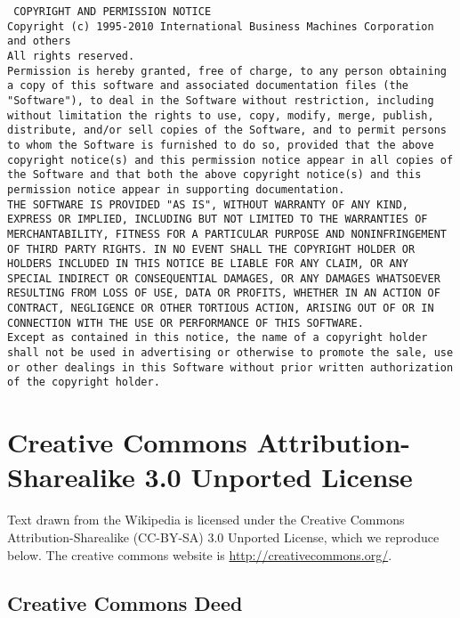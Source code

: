 \setlength{\baselineskip}{0.5\oldbaselineskip}
{\tiny\tt
\noindent
COPYRIGHT AND PERMISSION NOTICE
\\[4pt]
Copyright (c) 1995-2010 International Business Machines Corporation
and others
\\[4pt]
All rights reserved.
\\[4pt]
Permission is hereby granted, free of charge, to any person obtaining
a copy of this software and associated documentation files (the
"Software"), to deal in the Software without restriction, including
without limitation the rights to use, copy, modify, merge, publish,
distribute, and/or sell copies of the Software, and to permit persons
to whom the Software is furnished to do so, provided that the above
copyright notice(s) and this permission notice appear in all copies of
the Software and that both the above copyright notice(s) and this
permission notice appear in supporting documentation.
\\[4pt]
THE SOFTWARE IS PROVIDED "AS IS", WITHOUT WARRANTY OF ANY KIND,
EXPRESS OR IMPLIED, INCLUDING BUT NOT LIMITED TO THE WARRANTIES OF
MERCHANTABILITY, FITNESS FOR A PARTICULAR PURPOSE AND NONINFRINGEMENT
OF THIRD PARTY RIGHTS. IN NO EVENT SHALL THE COPYRIGHT HOLDER OR
HOLDERS INCLUDED IN THIS NOTICE BE LIABLE FOR ANY CLAIM, OR ANY
SPECIAL INDIRECT OR CONSEQUENTIAL DAMAGES, OR ANY DAMAGES WHATSOEVER
RESULTING FROM LOSS OF USE, DATA OR PROFITS, WHETHER IN AN ACTION OF
CONTRACT, NEGLIGENCE OR OTHER TORTIOUS ACTION, ARISING OUT OF OR IN
CONNECTION WITH THE USE OR PERFORMANCE OF THIS SOFTWARE.
\\[4pt]
Except as contained in this notice, the name of a copyright holder
shall not be used in advertising or otherwise to promote the sale, use
or other dealings in this Software without prior written authorization
of the copyright holder.
}

\section{Creative Commons Attribution-Sharealike 3.0 Unported License}

\setlength{\baselineskip}{\oldbaselineskip}
\noindent
Text drawn from the Wikipedia is licensed under the Creative Commons
Attribution-Sharealike (CC-BY-SA) 3.0 Unported License, which we
reproduce below.  The creative commons website is
\url{http://creativecommons.org/}.

\subsection{Creative Commons Deed}

